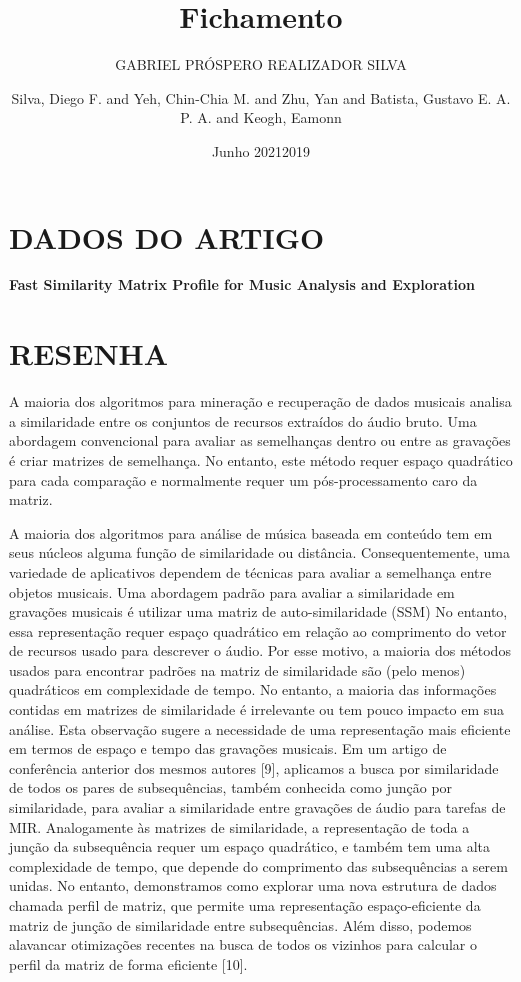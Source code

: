 \documentclass{article}
\title{Fichamento}
\author{GABRIEL PRÓSPERO REALIZADOR  SILVA}
\date{Junho 2021}
\begin{document}
\maketitle

\section{DADOS DO ARTIGO}
\textbf{Fast Similarity Matrix Profile for Music Analysis and Exploration \\}
\author{Silva, Diego F. and Yeh, Chin-Chia M. and Zhu, Yan and Batista, Gustavo E. A. P. A. and Keogh, Eamonn \\}
\date{2019}

\section{RESENHA}
A maioria dos algoritmos para mineração e recuperação de dados musicais analisa a similaridade entre os conjuntos de recursos extraídos do áudio bruto. Uma abordagem convencional para avaliar as semelhanças dentro ou entre as gravações é criar matrizes de semelhança. No entanto, este método requer espaço quadrático para cada comparação e normalmente requer um pós-processamento caro da matriz.

A maioria dos algoritmos para análise de música baseada em conteúdo tem em seus núcleos alguma função de similaridade ou distância. Consequentemente, uma variedade de aplicativos dependem de técnicas para avaliar a semelhança entre objetos musicais.
Uma abordagem padrão para avaliar a similaridade em gravações musicais é utilizar uma matriz de auto-similaridade (SSM)
No entanto, essa representação requer espaço quadrático em relação ao comprimento do vetor de recursos usado para descrever o áudio. Por esse motivo, a maioria dos métodos usados ​​para encontrar padrões na matriz de similaridade são (pelo menos) quadráticos em complexidade de tempo. No entanto, a maioria das informações contidas em matrizes de similaridade é irrelevante ou tem pouco impacto em sua análise. Esta observação sugere a necessidade de uma representação mais eficiente em termos de espaço e tempo das gravações musicais. Em um artigo de conferência anterior dos mesmos autores [9], aplicamos a busca por similaridade de todos os pares de subsequências, também conhecida como junção por similaridade, para avaliar a similaridade entre gravações de áudio para tarefas de MIR. Analogamente às matrizes de similaridade, a representação de toda a junção da subsequência requer um espaço quadrático, e também tem uma alta complexidade de tempo, que depende do comprimento das subsequências a serem unidas. No entanto, demonstramos como explorar uma nova estrutura de dados chamada perfil de matriz, que permite uma representação espaço-eficiente da matriz de junção de similaridade entre subsequências. Além disso, podemos alavancar otimizações recentes na busca de todos os vizinhos para calcular o perfil da matriz de forma eficiente [10].
\end{document}
